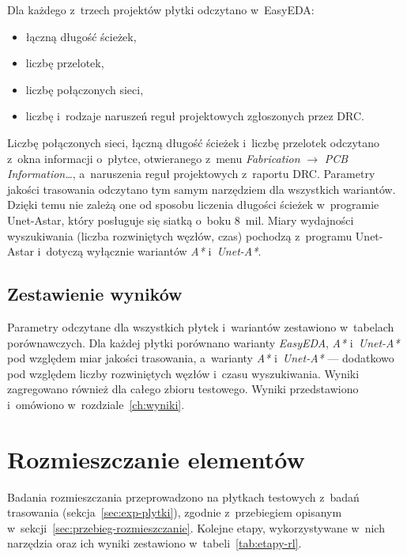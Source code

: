 Dla każdego z~trzech projektów płytki odczytano w~EasyEDA:
\begin{itemize}
  \item łączną długość ścieżek,
  \item liczbę przelotek,
  \item liczbę połączonych sieci,
  \item liczbę i~rodzaje naruszeń reguł projektowych zgłoszonych przez
    DRC.
\end{itemize}
Liczbę połączonych sieci, łączną długość ścieżek i~liczbę przelotek
odczytano z~okna informacji o~płytce, otwieranego z~menu
\emph{Fabrication} $\rightarrow$ \emph{PCB Information\ldots}, a~naruszenia
reguł projektowych z~raportu DRC.
Parametry jakości trasowania odczytano tym samym narzędziem dla wszystkich
wariantów. Dzięki temu nie zależą one od sposobu liczenia długości ścieżek
w~programie Unet-Astar, który posługuje się siatką o~boku 8~mil.
Miary wydajności wyszukiwania (liczba rozwiniętych węzłów, czas) pochodzą
z~programu Unet-Astar i~dotyczą wyłącznie wariantów \emph{A*}
i~\emph{Unet-A*}.

\subsection{Zestawienie wyników}
\label{sec:exp-zestawienie}

Parametry odczytane dla wszystkich płytek i~wariantów zestawiono w~tabelach
porównawczych. Dla każdej płytki porównano warianty \emph{EasyEDA},
\emph{A*} i~\emph{Unet-A*} pod względem miar jakości trasowania, a~warianty
\emph{A*} i~\emph{Unet-A*} --- dodatkowo pod względem liczby rozwiniętych
węzłów i~czasu wyszukiwania. Wyniki zagregowano również dla całego zbioru
testowego. Wyniki przedstawiono i~omówiono w~rozdziale~\ref{ch:wyniki}.

\section{Rozmieszczanie elementów}
\label{sec:exp-rozmieszczanie}

Badania rozmieszczania przeprowadzono na płytkach testowych z~badań
trasowania (sekcja~\ref{sec:exp-plytki}), zgodnie z~przebiegiem opisanym
w~sekcji~\ref{sec:przebieg-rozmieszczanie}. Kolejne etapy, wykorzystywane
w~nich narzędzia oraz ich wyniki zestawiono w~tabeli~\ref{tab:etapy-rl}.

